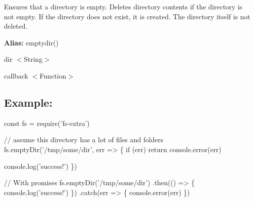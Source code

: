 Ensures that a directory is empty. Deletes directory contents if the directory is not empty. If the directory does not exist, it is created. The directory itself is not deleted.

{\bfseries Alias\+:} {\ttfamily emptydir()}


\begin{DoxyItemize}
\item {\ttfamily dir} {\ttfamily $<$String$>$}
\item {\ttfamily callback} {\ttfamily $<$Function$>$}
\end{DoxyItemize}

\subsection*{Example\+:}


\begin{DoxyCode}
const fs = require('fs-extra')

// assume this directory has a lot of files and folders
fs.emptyDir('/tmp/some/dir', err => \{
  if (err) return console.error(err)

  console.log('success!')
\})

// With promises
fs.emptyDir('/tmp/some/dir')
.then(() => \{
  console.log('success!')
\})
.catch(err => \{
  console.error(err)
\})
\end{DoxyCode}
 